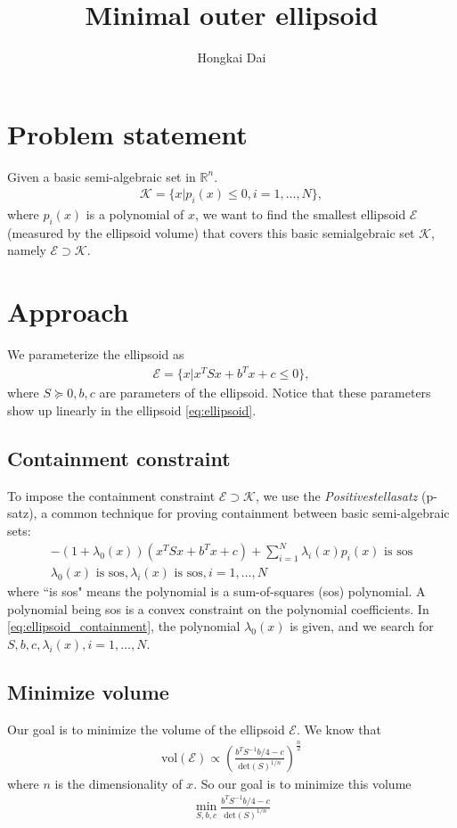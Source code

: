 \documentclass{article}
\title{Minimal outer ellipsoid}
\author{Hongkai Dai}
\date{}
\begin{document}
\maketitle
\section{Problem statement}
Given a basic semi-algebraic set in $\mathbb{R}^n$.
\begin{align}
	\mathcal{K} = \{x | p_i(x) \le 0, i=1,\hdots, N\},
\end{align}
where $p_i(x)$ is a polynomial of $x$, we want to find the smallest ellipsoid $\mathcal{E}$ (measured by the ellipsoid volume) that covers this basic semialgebraic set $\mathcal{K}$, namely $\mathcal{E}\supset\mathcal{K}$.

\section{Approach}
We parameterize the ellipsoid as
\begin{align}
	\mathcal{E} = \{x | x^TSx+b^Tx+c\le 0\} \label{eq:ellipsoid},
\end{align}
where $S\succeq 0, b, c$ are parameters of the ellipsoid. Notice that these parameters show up linearly in the ellipsoid \eqref{eq:ellipsoid}.

\subsection{Containment constraint}
To impose the containment constraint $\mathcal{E}\supset\mathcal{K}$, we use the \textit{Positivestellasatz} (p-satz), a common technique for proving containment between basic semi-algebraic sets:
\begin{subequations}
\begin{align}
	-(1+\lambda_0(x))(x^TSx + b^Tx + c) + \sum_{i=1}^N \lambda_i(x) p_i(x) \text{ is sos}\\
	\lambda_0(x) \text{ is sos}, \lambda_i(x) \text{ is sos}, i=1,\hdots, N
\end{align}
	\label{eq:ellipsoid_containment}
\end{subequations}
where ``is sos" means the polynomial is a sum-of-squares (sos) polynomial. A polynomial being sos is a convex constraint on the polynomial coefficients. In \eqref{eq:ellipsoid_containment}, the polynomial $\lambda_0(x)$ is given, and we search for $S, b, c, \lambda_i(x), i=1,\hdots, N$.

\subsection{Minimize volume}
Our goal is to minimize the volume of the ellipsoid $\mathcal{E}$. We know that
\begin{align}
	\text{vol}(\mathcal{E})\propto\left(\frac{b^TS^{-1}b/4-c}{\text{det}(S)^{1/n}}\right)^{\frac{n}{2}} \label{eq:ellipsoid_volume}
\end{align}
where $n$ is the dimensionality of $x$. So our goal is to minimize this volume
\begin{align}
	\min_{S, b, c} \frac{b^TS^{-1}b/4-c}{\text{det}(S)^{1/n}} \label{eq:minimize_volume}
\end{align}
\end{document}
